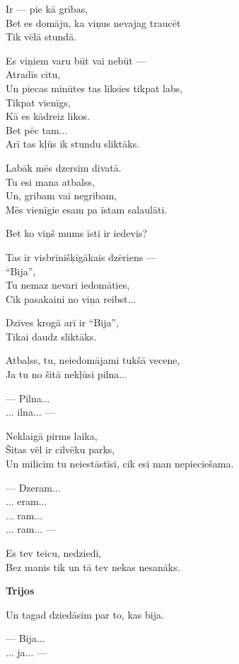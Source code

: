 \documentclass[14pt]{extarticle}
\begin{document}
Ir --- pie kā gribas,\\
Bet es domāju, ka viņus nevajag traucēt\\
Tik vēlā stundā.

Es viņiem varu būt vai nebūt ---\\
Atradīs citu,\\
Un piecas minūtes tas liksies tikpat labs,\\
Tikpat vienīgs,\\
Kā es kādreiz likos.\\
Bet pēc tam...\\
Arī tas kļūs ik stundu sliktāks.

Labāk mēs dzersim divatā.\\
Tu esi mana atbalss,\\
Un, gribam vai negribam,\\
Mēs vienīgie esam pa īstam salaulāti.

Bet ko viņš mums īsti ir iedevis?

Tas ir visbrīnišķīgākais dzēriens ---\\
``Bija'',\\
Tu nemaz nevari iedomāties,\\
Cik pasakaini no viņa reibst...

Dzīves krogā arī ir ``Bija'',\\
Tikai daudz sliktāks.

Atbalss, tu, neiedomājami tukšā vecene,\\
Ja tu no šitā nekļūsi pilna...

--- Pilna...\\
... ilna... ---

Neklaigā pirms laika,\\
Šitas vēl ir cilvēku parks,\\
Un milicim tu neiestāstīsi, cik esi man nepieciešama.

--- Dzeram...\\
... eram...\\
... ram...\\
... ram... ---

Es tev teicu, nedziedi,\\
Bez manis tik un tā tev nekas nesanāks.



\newpage

{\bf Trijos}

Un tagad dziedāsim par to, kas bija.

--- Bija...\\
... ja... ---
\end{document}
